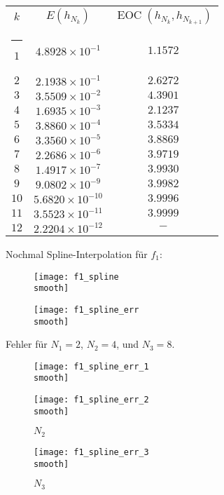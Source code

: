 \documentclass[]{scrartcl}
\makeatletter
\newcommand{\thickhline}{%
    \noalign {\ifnum 0=`}\fi \hrule height 1pt
    \futurelet \reserved@a \@xhline
}
\makeatother
\begin{document}
 	\renewcommand{\arraystretch}{1.2}
 	\begin{tabular}{|c|c|c|}\hline
 	$k$  & $E(h_{N_k})$ & $\operatorname{EOC}(h_{N_k},h_{N_{k+1}})$\\\thickhline
 	$1$  & $4.8928\times10^{-1}$ & $1.1572$\\\hline
 	$2$  & $2.1938\times10^{-1}$ & $2.6272$\\\hline
 	$3$  & $3.5509\times10^{-2}$ & $4.3901$\\\hline
 	$4$  & $1.6935\times10^{-3}$ & $2.1237$\\\hline
 	$5$  & $3.8860\times10^{-4}$ & $3.5334$\\\hline
 	$6$  & $3.3560\times10^{-5}$ & $3.8869$\\\hline
 	$7$  & $2.2686\times10^{-6}$ & $3.9719$\\\hline
 	$8$  & $1.4917\times10^{-7}$ & $3.9930$\\\hline
 	$9$  & $9.0802\times10^{-9}$ & $3.9982$\\\hline
 	$10$ & $5.6820\times10^{-10}$ & $3.9996$\\\hline
 	$11$ & $3.5523\times10^{-11}$ & $3.9999$\\\hline
 	$12$ & $2.2204\times10^{-12}$ & $-$\\\hline
 	\end{tabular}
 	
 	Nochmal Spline-Interpolation für $f_1$:
	\begin{figure}[h]
		\centering
		\begin{minipage}{0.5\textwidth}
			\texttt{[image: f1\_spline\\smooth]}
			\caption{}
		\end{minipage}
		\begin{minipage}{0.49\textwidth}
			\texttt{[image: f1\_spline\_err\\smooth]}
			\caption{}
		\end{minipage}
	\end{figure} 
	
	Fehler für $N_1=2$, $N_2=4$, und $N_3=8$.
	\begin{figure}[h]
 		\centering
 		\begin{minipage}{0.5\textwidth}
 			\texttt{[image: f1\_spline\_err\_1\\smooth]}
 			\caption{$N_1$}
 		\end{minipage}
 		\begin{minipage}{0.49\textwidth}
 			\texttt{[image: f1\_spline\_err\_2\\smooth]}
 			\caption{$N_2$}
 		\end{minipage}
 	\end{figure}
 	
 	\begin{figure}[h]
 		\centering
		\texttt{[image: f1\_spline\_err\_3\\smooth]}
		\caption{$N_3$}
 	\end{figure}
\end{document}
